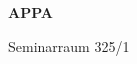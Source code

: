 \documentclass[a4paper]{article}
\begin{document}
\printGenericVSLHeader
\begin{center}
\begin{vsltext}{3cm}{4cm}

   \vspace{0.5cm} 

    \textbf{APPA} 

    \vspace{1.5cm}

    Seminarraum 325/1

\end{vsltext}

\end{center}
\end{document}
